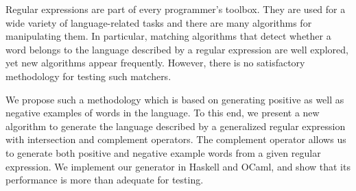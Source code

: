 Regular expressions are part of every programmer's toolbox.  They are
used for a wide variety of language-related tasks and there are many algorithms for
manipulating them. In particular, matching algorithms that detect
whether a word belongs to the language described by a regular
expression are well explored, 
yet new algorithms appear frequently. However, there is
no satisfactory methodology for testing such matchers.

We propose such a methodology which is based on generating positive as
well as negative examples of words in the language. To this end, we
present a new algorithm to generate the language described by a
generalized regular expression with intersection and complement
operators.  The complement operator allows us to generate both
positive and negative example words from a given regular expression.
We implement our generator in Haskell and OCaml, and show that its
performance is more than adequate for testing.

